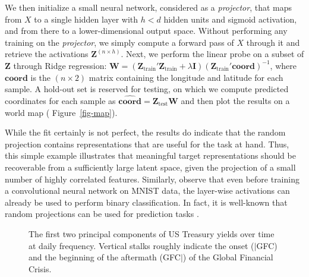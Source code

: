 \documentclass{article}
\theoremstyle{plain}
\theoremstyle{definition}
\theoremstyle{remark}
\begin{document}
We then initialize a small neural network, considered as a \emph{projector}, that maps from \(X\) to a single hidden layer with \(h<d\) hidden units and sigmoid activation, and from there to a lower-dimensional output space. Without performing any training on the \emph{projector}, we simply compute a forward pass of \(X\) through 
it and retrieve the activations \(\mathbf{Z}^{(n\times h)}\). Next, we perform the linear probe on a subset of \(\mathbf{Z}\) through Ridge regression: \(\mathbf{W} = (\mathbf{Z}_{\text{train}}'\mathbf{Z}_{\text{train}} + \lambda \mathbf{I}) (\mathbf{Z}_{\text{train}}'\textbf{coord})^{-1}\), where \(\textbf{coord}\) is the \((n \times 2)\) matrix containing the longitude and latitude for each sample. A hold-out set is reserved for testing, on which we compute predicted coordinates for each sample as \(\widehat{\textbf{coord}}=\mathbf{Z}_{\text{test}}\mathbf{W}\) and then plot the results on a world map ( Figure~\ref{fig-map}).  

While the fit certainly is not perfect, the results do indicate that the random projection contains representations that are useful for the task at hand. Thus, %
this simple example illustrates that meaningful target representations should be recoverable from a sufficiently large latent space, given the projection of a small number of highly correlated features. Similarly, \citet{alain2018understanding} observe that even before training a convolutional neural network on MNIST data, the layer-wise activations can already be used to perform binary classification. In fact, it is well-known that random projections can be used for prediction tasks \cite{dasgupta2013experiments}.

\begin{figure}[htp]


\caption{\label{fig-pca}The first two principal components of US Treasury yields over time at daily frequency. Vertical stalks roughly indicate the onset ($|$GFC) and the beginning of the aftermath (GFC$|$) of the Global Financial Crisis.}

\end{figure}
\end{document}
